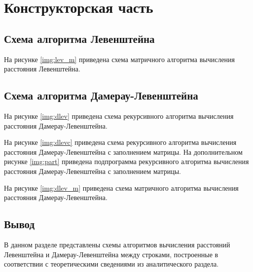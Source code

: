 \chapter{Конструкторская часть}

\section{Схема алгоритма Левенштейна}

На рисунке \ref{img:lev_m} приведена схема матричного алгоритма вычисления расстояния Левенштейна.


\pagebreak

\section{Схема алгоритма Дамерау-Левенштейна}

На рисунке \ref{img:dlev} приведена схема рекурсивного алгоритма вычисления расстояния Дамерау-Левенштейна.


\pagebreak

На рисунке \ref{img:dlevc} приведена схема рекурсивного алгоритма вычисления расстояния Дамерау-Левенштейна с заполнением матрицы. На дополнительном рисунке \ref{img:part} приведена подпрограмма рекурсивного алгоритма вычисления расстояния Дамерау-Левенштейна с заполнением матрицы.



\pagebreak

На рисунке \ref{img:dlev_m} приведена схема матричного алгоритма вычисления расстояния Дамерау-Левенштейна.


\pagebreak

\section*{Вывод}

В данном разделе представлены схемы алгоритмов вычисления расстояний Левенштейна и Дамерау-Левенштейна между строками, построенные в соответствии с теоретическими сведениями из аналитического раздела.
